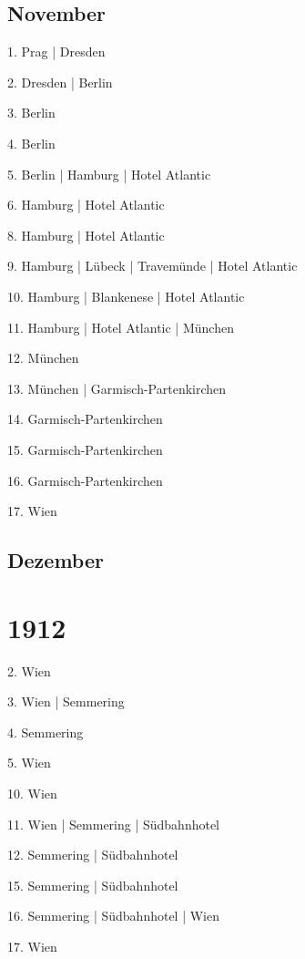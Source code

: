 \documentclass[twoside=false,titlepage=false,open=any, parskip=never, fontsize=10pt, headings=small, chapterprefix=false, appendixprefix=false, DIV=15]{scrbook}
\begin{document}
\begin{multicols}{3}
            \section*{November}
            1. Prag | Dresden\par
            2. Dresden | Berlin\par
            3. Berlin\par
            4. Berlin\par
            5. Berlin | Hamburg | Hotel Atlantic\par
            6. Hamburg | Hotel Atlantic\par
            8. Hamburg | Hotel Atlantic\par
            9. Hamburg | Lübeck | Travemünde | Hotel Atlantic\par
            10. Hamburg | Blankenese | Hotel Atlantic\par
            11. Hamburg | Hotel Atlantic | München\par
            12. München\par
            13. München | Garmisch-Partenkirchen\par
            14. Garmisch-Partenkirchen\par
            15. Garmisch-Partenkirchen\par
            16. Garmisch-Partenkirchen\par
            17. Wien\par
            \section*{Dezember}
            \chapter*{1912}
            2. Wien\par
            3. Wien | Semmering\par
            4. Semmering\par
            5. Wien\par
            10. Wien\par
            11. Wien | Semmering | Südbahnhotel\par
            12. Semmering | Südbahnhotel\par
            15. Semmering | Südbahnhotel\par
            16. Semmering | Südbahnhotel | Wien\par
            17. Wien\par

\end{multicols}
\end{document}
